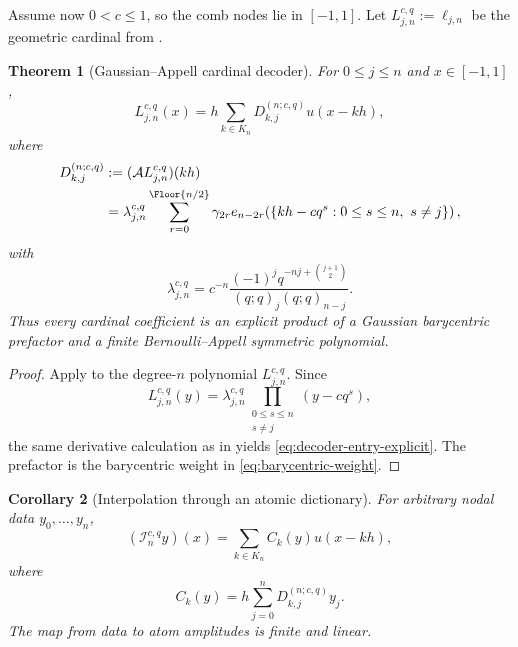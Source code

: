 \documentclass[11pt,oneside]{book}
\numberwithin{equation}{chapter}
\newtheorem{theorem}{Theorem}[chapter]
\newtheorem{corollary}[theorem]{Corollary}
\theoremstyle{definition}
\theoremstyle{remark}
\newcommand{\App}{\mathcal A}
\newcommand{\Interp}{\mathcal I}
\begin{document}
Assume now $0<c\le1$, so the comb nodes lie in $[-1,1]$.  Let
$L_{j,n}^{c,q}:=\ell_{j,n}$ be the geometric cardinal from .

\begin{theorem}[Gaussian--Appell cardinal decoder]
\label{thm:gaussian-Appell-decoder}
For $0\le j\le n$ and $x\in[-1,1]$,
\begin{equation}
 \boxed{
 L_{j,n}^{c,q}(x)
 =h\sum_{k\in K_n}D_{k,j}^{(n;c,q)}u(x-kh),}
 \label{eq:cardinal-up-decoder}
\end{equation}
where
\begin{align}
 D_{k,j}^{(n;c,q)}
 &:=(\App L_{j,n}^{c,q})(kh)
 \label{eq:decoder-entry-definition}\\
 &=\lambda_{j,n}^{c,q}
   \sum_{r=0}^{\Floor{n/2}}\gamma_{2r}
   e_{n-2r}\!\left(
     \{kh-cq^s:0\le s\le n,\ s\ne j\}\right),
 \label{eq:decoder-entry-explicit}
\end{align}
with
\begin{equation}
 \lambda_{j,n}^{c,q}
 =c^{-n}\frac{(-1)^jq^{-nj+\binom{j+1}{2}}}
 {(q;q)_j(q;q)_{n-j}}.
 \label{eq:decoder-gaussian-prefactor}
\end{equation}
Thus every cardinal coefficient is an explicit product of a Gaussian
barycentric prefactor and a finite Bernoulli--Appell symmetric polynomial.
\end{theorem}

\begin{proof}
Apply  to the degree-$n$ polynomial
$L_{j,n}^{c,q}$.  Since
\[
 L_{j,n}^{c,q}(y)
 =\lambda_{j,n}^{c,q}
  \prod_{\substack{0\le s\le n\\s\ne j}}(y-cq^s),
\]
the same derivative calculation as in
 yields
\eqref{eq:decoder-entry-explicit}.  The prefactor is the barycentric weight in
\eqref{eq:barycentric-weight}.
\end{proof}

\begin{corollary}[Interpolation through an atomic dictionary]
\label{cor:interpolation-up-factorization}
For arbitrary nodal data $y_0,\ldots,y_n$,
\begin{equation}
 \boxed{
 (\Interp_n^{c,q}y)(x)
 =\sum_{k\in K_n}C_k(y)u(x-kh),}
 \label{eq:interpolation-up-factorization}
\end{equation}
where
\begin{equation}
 C_k(y)=h\sum_{j=0}^{n}D_{k,j}^{(n;c,q)}y_j.
 \label{eq:atomic-coefficient-transform}
\end{equation}
The map from data to atom amplitudes is finite and linear.
\end{corollary}
\end{document}
